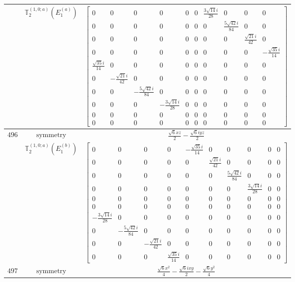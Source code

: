 \documentclass[fleqn,8pt,landscape]{jsarticle}
\begin{document}
\begin{longtable}{ccc}
$  $ & $ \mathbb{T}_{2}^{(1,0;a)}(E_{1}^{(a)}) $ & $ \begin{bmatrix} 0 & 0 & 0 & 0 & 0 & 0 & \frac{3 \sqrt{14} i}{28} & 0 & 0 & 0 \\ 0 & 0 & 0 & 0 & 0 & 0 & 0 & \frac{5 \sqrt{42} i}{84} & 0 & 0 \\ 0 & 0 & 0 & 0 & 0 & 0 & 0 & 0 & \frac{\sqrt{21} i}{42} & 0 \\ 0 & 0 & 0 & 0 & 0 & 0 & 0 & 0 & 0 & - \frac{\sqrt{35} i}{14} \\ \frac{\sqrt{35} i}{14} & 0 & 0 & 0 & 0 & 0 & 0 & 0 & 0 & 0 \\ 0 & - \frac{\sqrt{21} i}{42} & 0 & 0 & 0 & 0 & 0 & 0 & 0 & 0 \\ 0 & 0 & - \frac{5 \sqrt{42} i}{84} & 0 & 0 & 0 & 0 & 0 & 0 & 0 \\ 0 & 0 & 0 & - \frac{3 \sqrt{14} i}{28} & 0 & 0 & 0 & 0 & 0 & 0 \\ 0 & 0 & 0 & 0 & 0 & 0 & 0 & 0 & 0 & 0 \\ 0 & 0 & 0 & 0 & 0 & 0 & 0 & 0 & 0 & 0 \end{bmatrix} $ \\ \hline
$ 496 $ & $ \text{symmetry} $ & $ \frac{\sqrt{6} x z}{2} - \frac{\sqrt{6} i y z}{2} $ \\
$  $ & $ \mathbb{T}_{2}^{(1,0;a)}(E_{1}^{(b)}) $ & $ \begin{bmatrix} 0 & 0 & 0 & 0 & - \frac{\sqrt{35} i}{14} & 0 & 0 & 0 & 0 & 0 \\ 0 & 0 & 0 & 0 & 0 & \frac{\sqrt{21} i}{42} & 0 & 0 & 0 & 0 \\ 0 & 0 & 0 & 0 & 0 & 0 & \frac{5 \sqrt{42} i}{84} & 0 & 0 & 0 \\ 0 & 0 & 0 & 0 & 0 & 0 & 0 & \frac{3 \sqrt{14} i}{28} & 0 & 0 \\ 0 & 0 & 0 & 0 & 0 & 0 & 0 & 0 & 0 & 0 \\ 0 & 0 & 0 & 0 & 0 & 0 & 0 & 0 & 0 & 0 \\ - \frac{3 \sqrt{14} i}{28} & 0 & 0 & 0 & 0 & 0 & 0 & 0 & 0 & 0 \\ 0 & - \frac{5 \sqrt{42} i}{84} & 0 & 0 & 0 & 0 & 0 & 0 & 0 & 0 \\ 0 & 0 & - \frac{\sqrt{21} i}{42} & 0 & 0 & 0 & 0 & 0 & 0 & 0 \\ 0 & 0 & 0 & \frac{\sqrt{35} i}{14} & 0 & 0 & 0 & 0 & 0 & 0 \end{bmatrix} $ \\ \hline
$ 497 $ & $ \text{symmetry} $ & $ \frac{\sqrt{6} x^{2}}{4} - \frac{\sqrt{6} i x y}{2} - \frac{\sqrt{6} y^{2}}{4} $ \\

\end{longtable}
\end{document}
